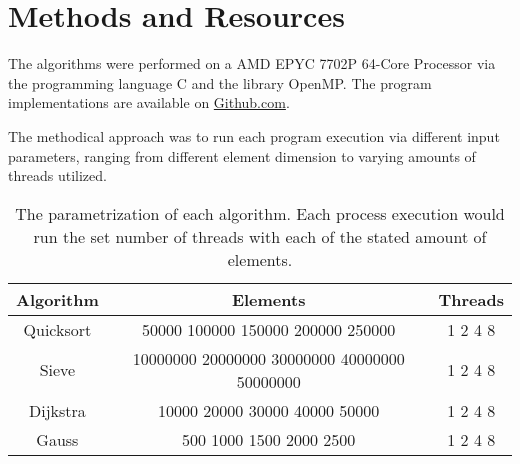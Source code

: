\chapter{Methods and Resources}

The algorithms were performed on a AMD EPYC 7702P 64-Core Processor 
via the programming language C and the library OpenMP.
The program implementations are available on 
\href{https://github.com/ThompsonA93/C-Slurm-Benchmark}{Github.com}.

The methodical approach was to run each program execution 
via different input parameters, ranging from different element 
dimension to varying amounts of threads utilized.

\begin{table}[H]
    \centering
    \begin{tabular}{|c|c|c|}\hline
        Algorithm & Elements & Threads \\\hline
        Quicksort & 50000 100000 150000 200000 250000 &  1 2 4 8 \\
        Sieve & 10000000 20000000 30000000 40000000 50000000 & 1 2 4 8 \\
        Dijkstra & 10000 20000 30000 40000 50000 & 1 2 4 8 \\
        Gauss & 500 1000 1500 2000 2500 & 1 2 4 8 \\
        
    \end{tabular}
    \caption{The parametrization of each algorithm. Each process execution would run the set number of threads with each of the stated amount of elements.}
    \label{tab:my_label}
\end{table}

